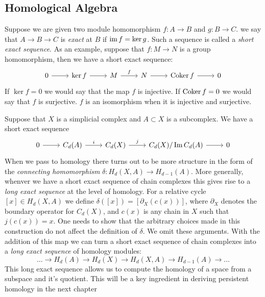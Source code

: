 \subsection{Homological Algebra} 
Suppose we are given two module homomorphism $f: A \rightarrow B$ and $g: B \rightarrow C$. we say that $A \rightarrow B \rightarrow C$
is \emph{exact} at $B$ if $\operatorname{im}{f} =  \ker{g}$. Such a sequence is called a \emph{short exact sequence}. As an example, suppose that $f: M \rightarrow N$ is a group homomorphism, then we have a short exact sequence:
\[ 
\begin{tikzcd}
0 \arrow{r} & \ker{f} \arrow{r} & M \arrow{r}{f} & N \arrow{r} & \coker{f} \arrow{r}& 0
\end{tikzcd}
\] 
If $\ker{f} = 0$ we would say that the map $f$ is injective. If $\operatorname{Coker}{f} = 0$ we would say that $f$ is surjective. $f$ is an isomorphism when it is injective and surjective. 

Suppose that $X$ is a simplicial complex and $A \subset X$ is a subcomplex. We have a short exact sequence 
\[
\begin{tikzcd}
0 \arrow{r}& C_d(A) \arrow{r}{i} & C_d(X) \arrow{r}{j} & C_d(X)/\Im{C_d(A)} \arrow{r} & 0 
\end{tikzcd}
\]
When we pass to homology there turns out to be more structure in the form of the \emph{connecting homomorphism}  $\delta: H_d(X,A) \rightarrow H_{d-1}(A)$. More generally, whenver we have a short exact sequence of chain complexes this gives rise to a \emph{long exact sequence} at the level of homology. 
 For a relative cycle $[x] \in H_d(X,A)$ we define $\delta([x]) = [\partial_X(c(x))]$, where $\partial_X$ denotes the boundary operator for $C_d(X)$, and $c(x)$ is any chain in $X$ such that $j(c(x)) = x$. One needs to show that the arbitrary choices made in this construction do not affect the definition of $\delta$. We omit these arguments. 
 With the addition of this map we can turn a short exact sequence of chain complexes into a \emph{long exact sequence} of homology modules:
\[ \ldots \rightarrow H_d(A) \rightarrow H_d(X) \rightarrow H_d(X,A) \rightarrow H_{d-1}(A) \rightarrow \ldots \]
This long exact sequence allows us to compute the homology of a space from a subspace and it's quotient. This will be a key ingredient in deriving persistent homology in the next chapter